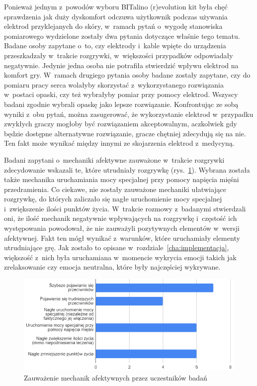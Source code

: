 Ponieważ jednym z~powodów wyboru BITalino (r)evolution kit była chęć sprawdzenia jak duży dyskomfort odczuwa użytkownik podczas używania elektrod przyklejanych do skóry, w~ramach pytań o~wygodę stanowiska pomiarowego wydzielone zostały dwa pytania dotyczące właśnie tego tematu. Badane osoby zapytane o~to, czy elektrody i~kable wpięte do urządzenia przeszkadzały w~trakcie rozgrywki, w~większości przypadków odpowiadały negatywnie. Jedynie jedna osoba nie potrafiła stwierdzić wpływu elektrod na komfort gry. W~ramach drugiego pytania osoby badane zostały zapytane, czy do pomiaru pracy serca wolałyby skorzystać z~wykorzystanego rozwiązania w~postaci opaski, czy też wybrałyby pomiar przy pomocy elektrod. Wszyscy badani zgodnie wybrali opaskę jako lepsze rozwiązanie. Konfrontując ze sobą wyniki z~obu pytań, można zasugerować, że wykorzystanie elektrod w~przypadku zwykłych graczy mogłoby być rozwiązaniem akceptowalnym, aczkolwiek gdy będzie dostępne alternatywne rozwiązanie, gracze chętniej zdecydują się na nie. Ten fakt może wynikać między innymi ze skojarzenia elektrod z~medycyną.

Badani zapytani o~mechaniki afektywne zauważone w~trakcie rozgrywki zdecydowanie wskazali te, które utrudniały rozgrywkę (rys.~\ref{fig:seen_mechanics}). Wybrana została także mechanika uruchamiania mocy specjalnej przy pomocy napięcia mięśni przedramienia. Co ciekawe, nie zostały zauważone mechaniki ułatwiające rozgrywkę, do których zaliczało się nagłe uruchomienie mocy specjalnej i~zwiększenie ilości punktów życia. W~trakcie rozmowy z~badanymi stwierdzali oni, że ilość mechanik negatywnie wpływających na rozgrywkę i~częstość ich występowania powodował, że nie zauważyli pozytywnych elementów w~wersji afektywnej. Fakt ten mógł wynikać z~warunków, które uruchamiały elementy utrudniające grę. Jak zostało to opisane w~rozdziale~\ref{cha:implementacja}, większość z~nich była uruchamiana w~momencie wykrycia emocji takich jak zrelaksowanie czy emocja neutralna, które były najczęściej wykrywane.
\begin{figure}
	\centering
	\includegraphics[width=0.8\linewidth]{images/affective_mechanics_seen.png}
	\caption{Zauważenie mechanik afektywnych przez uczestników badań}
	\label{fig:seen_mechanics}
\end{figure}

